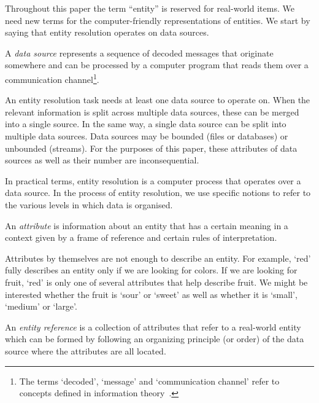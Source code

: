 Throughout this paper the term ``entity'' is reserved for real-world items.
We need new terms for the computer-friendly representations of entities.
We start by saying that entity resolution operates on data sources.

\begin{defn}
    A \textit{data source} represents a sequence of decoded messages
    that originate somewhere and can be processed by a computer program that
    reads them over a communication channel\footnote{The terms `decoded', `message' and `communication channel' refer to concepts
    defined in information theory~\cite{ash2012it}.}.
\end{defn}



An entity resolution task needs at least one data source to operate on.
When the relevant information is split across multiple data sources, these
can be merged into a single source.
In the same way, a single data source can be split into multiple data
sources.
Data sources may be bounded (files or databases) or unbounded (streams).
For the purposes of this paper, these attributes of data sources as well as
their number are inconsequential.

In practical terms, entity resolution is a computer process that operates
over a data source.
In the process of entity resolution, we use specific notions to refer to the
various levels in which data is organised.

\begin{defn}
    An \textit{attribute} is information about an entity that has a certain
    meaning in a context given by a frame of reference and certain rules of
    interpretation.
\end{defn}

Attributes by themselves are not enough to describe an entity.
For example, `red' fully describes an entity only if we are looking for
colors.
If we are looking for fruit, `red' is only one of several attributes that
help describe fruit.
We might be interested whether the fruit is `sour' or `sweet' as well as
whether it is `small', `medium' or `large'.

\begin{defn}
    An \textit{entity reference} is a collection of attributes that refer
    to a real-world entity which can be formed by following an organizing
    principle (or order) of the data source where the attributes are all
    located.
\end{defn}

